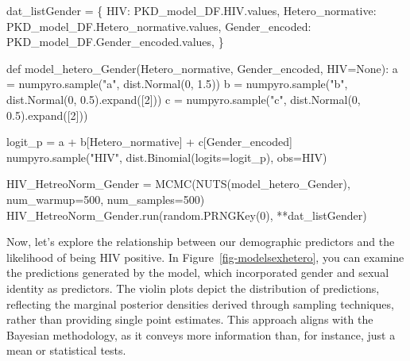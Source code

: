 \documentclass[
  12pt,
  letterpaper,
  DIV=11,
  numbers=noendperiod]{scrartcl}
\newenvironment{Shaded}{\begin{snugshade}}{\end{snugshade}}
\newcommand{\DecValTok}[1]{\textcolor[rgb]{0.68,0.00,0.00}{#1}}
\newcommand{\FloatTok}[1]{\textcolor[rgb]{0.68,0.00,0.00}{#1}}
\newcommand{\KeywordTok}[1]{\textcolor[rgb]{0.00,0.23,0.31}{#1}}
\newcommand{\NormalTok}[1]{\textcolor[rgb]{0.00,0.23,0.31}{#1}}
\newcommand{\OperatorTok}[1]{\textcolor[rgb]{0.37,0.37,0.37}{#1}}
\newcommand{\StringTok}[1]{\textcolor[rgb]{0.13,0.47,0.30}{#1}}
\newcommand{\VariableTok}[1]{\textcolor[rgb]{0.07,0.07,0.07}{#1}}
\begin{document}
\begin{Shaded}
\begin{Highlighting}[]
\NormalTok{dat\_listGender }\OperatorTok{=}\NormalTok{ \{}
    \StringTok{\textquotesingle{}HIV\textquotesingle{}}\NormalTok{: PKD\_model\_DF.HIV.values,}
    \StringTok{\textquotesingle{}Hetero\_normative\textquotesingle{}}\NormalTok{: PKD\_model\_DF.Hetero\_normative.values,}
    \StringTok{\textquotesingle{}Gender\_encoded\textquotesingle{}}\NormalTok{: PKD\_model\_DF.Gender\_encoded.values,}
\NormalTok{    \}}

\KeywordTok{def}\NormalTok{ model\_hetero\_Gender(Hetero\_normative, Gender\_encoded, HIV}\OperatorTok{=}\VariableTok{None}\NormalTok{):     }
\NormalTok{    a }\OperatorTok{=}\NormalTok{ numpyro.sample(}\StringTok{"a"}\NormalTok{, dist.Normal(}\DecValTok{0}\NormalTok{, }\FloatTok{1.5}\NormalTok{))  }
\NormalTok{    b }\OperatorTok{=}\NormalTok{ numpyro.sample(}\StringTok{"b"}\NormalTok{, dist.Normal(}\DecValTok{0}\NormalTok{, }\FloatTok{0.5}\NormalTok{).expand([}\DecValTok{2}\NormalTok{])) }
\NormalTok{    c }\OperatorTok{=}\NormalTok{ numpyro.sample(}\StringTok{"c"}\NormalTok{, dist.Normal(}\DecValTok{0}\NormalTok{, }\FloatTok{0.5}\NormalTok{).expand([}\DecValTok{2}\NormalTok{])) }

\NormalTok{    logit\_p }\OperatorTok{=}\NormalTok{ a }\OperatorTok{+}\NormalTok{ b[Hetero\_normative] }\OperatorTok{+}\NormalTok{ c[Gender\_encoded]}
\NormalTok{    numpyro.sample(}\StringTok{"HIV"}\NormalTok{, dist.Binomial(logits}\OperatorTok{=}\NormalTok{logit\_p), obs}\OperatorTok{=}\NormalTok{HIV)}

\NormalTok{HIV\_HetreoNorm\_Gender }\OperatorTok{=}\NormalTok{ MCMC(NUTS(model\_hetero\_Gender),}
\NormalTok{    num\_warmup}\OperatorTok{=}\DecValTok{500}\NormalTok{, num\_samples}\OperatorTok{=}\DecValTok{500}\NormalTok{) }
\NormalTok{HIV\_HetreoNorm\_Gender.run(random.PRNGKey(}\DecValTok{0}\NormalTok{), }\OperatorTok{**}\NormalTok{dat\_listGender)}
\end{Highlighting}
\end{Shaded}

\normalsize

Now, let's explore the relationship between our demographic predictors
and the likelihood of being HIV positive. In
Figure~\ref{fig-modelsexhetero}, you can examine the predictions
generated by the model, which incorporated gender and sexual identity as
predictors. The violin plots depict the distribution of predictions,
reflecting the marginal posterior densities derived through sampling
techniques, rather than providing single point estimates. This approach
aligns with the Bayesian methodology, as it conveys more information
than, for instance, just a mean or statistical tests.
\end{document}
